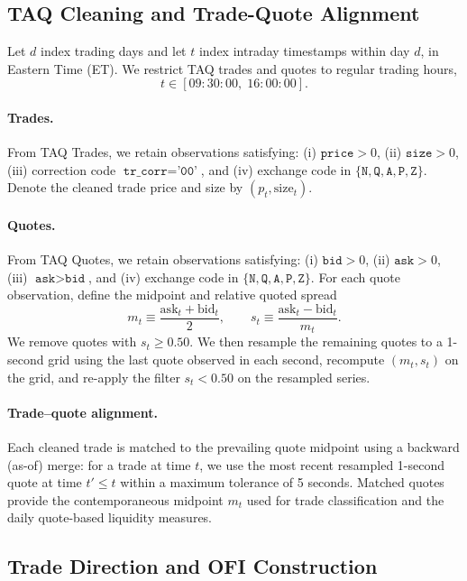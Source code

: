 \subsection{TAQ Cleaning and Trade-Quote Alignment}

Let $d$ index trading days and let $t$ index intraday timestamps within day $d$, in Eastern Time (ET).
We restrict TAQ trades and quotes to regular trading hours,
\[
t \in [09{:}30{:}00,\;16{:}00{:}00].
\]

\paragraph{Trades.}
From TAQ Trades, we retain observations satisfying: (i) $\texttt{price}>0$, (ii) $\texttt{size}>0$, (iii) correction code $\texttt{tr\_corr}=\texttt{'00'}$, and (iv) exchange code in $\{\texttt{N},\texttt{Q},\texttt{A},\texttt{P},\texttt{Z}\}$.
Denote the cleaned trade price and size by $(p_t,\text{size}_t)$.

\paragraph{Quotes.}
From TAQ Quotes, we retain observations satisfying: (i) $\texttt{bid}>0$, (ii) $\texttt{ask}>0$, (iii) $\texttt{ask}>\texttt{bid}$, and (iv) exchange code in $\{\texttt{N},\texttt{Q},\texttt{A},\texttt{P},\texttt{Z}\}$.
For each quote observation, define the midpoint and relative quoted spread
\begin{equation}
m_t \equiv \frac{\text{ask}_t+\text{bid}_t}{2},\qquad
s_t \equiv \frac{\text{ask}_t-\text{bid}_t}{m_t}.
\end{equation}
We remove quotes with $s_t \ge 0.50$.
We then resample the remaining quotes to a 1-second grid using the last quote observed in each second, recompute $(m_t,s_t)$ on the grid, and re-apply the filter $s_t<0.50$ on the resampled series.

\paragraph{Trade--quote alignment.}
Each cleaned trade is matched to the prevailing quote midpoint using a backward (as-of) merge: for a trade at time $t$, we use the most recent resampled 1-second quote at time $t' \le t$ within a maximum tolerance of 5 seconds.
Matched quotes provide the contemporaneous midpoint $m_t$ used for trade classification and the daily quote-based liquidity measures.

\subsection{Trade Direction and OFI Construction}

